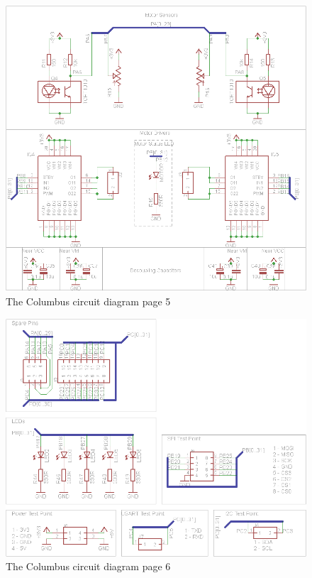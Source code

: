 \begin{figure}[ht!]
\centering
\includegraphics[angle = 90, width=\textwidth,height=\textheight,keepaspectratio]{./Figures/ColumbusCircuitPage5.png}
\caption{The Columbus circuit diagram page 5}
\label{sch:Columbus_Schematic:5}
\end{figure}

\begin{figure}[ht!]
\centering
\includegraphics[angle = 90, width=\textwidth,height=\textheight,keepaspectratio]{./Figures/ColumbusCircuitPage6.png}
\caption{The Columbus circuit diagram page 6}
\label{sch:Columbus_Schematic:6}
\end{figure}

